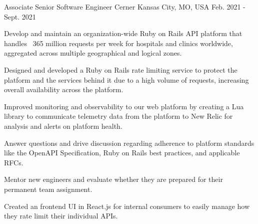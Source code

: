 \begin{cventries}
  \cventry
  {Associate Senior Software Engineer} %
  {Cerner} %
  {Kansas City, MO, USA} %
  {Feb. 2021 - Sept. 2021} %
  {
    \begin{cvitems} %
      \item {Develop and maintain an organization-wide Ruby on Rails API platform that handles ~365 million requests per week for hospitals and clinics worldwide, aggregated across multiple geographical and logical zones.}
      \item {Designed and developed a Ruby on Rails rate limiting service to protect the platform and the services behind it due to a high volume of requests, increasing overall availability across the platform.}
      \item {Improved monitoring and observability to our web platform by creating a Lua library to communicate telemetry data from the platform to New Relic for analysis and alerts on platform health.}
      \item {Answer questions and drive discussion regarding adherence to platform standards like the OpenAPI Specification, Ruby on Rails best practices, and applicable RFCs.}
      \item {Mentor new engineers and evaluate whether they are prepared for their permanent team assignment.}
      \item {Created an frontend UI in React.js for internal consumers to easily manage how they rate limit their individual APIs.}
    \end{cvitems}
  }


\end{cventries}
